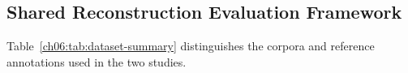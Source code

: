 
\subsection{Shared Reconstruction Evaluation Framework}\label{ch05:sec:shared-reconstruction-evaluation}

Table~\ref{ch06:tab:dataset-summary} distinguishes the corpora and reference annotations used in the two studies.






